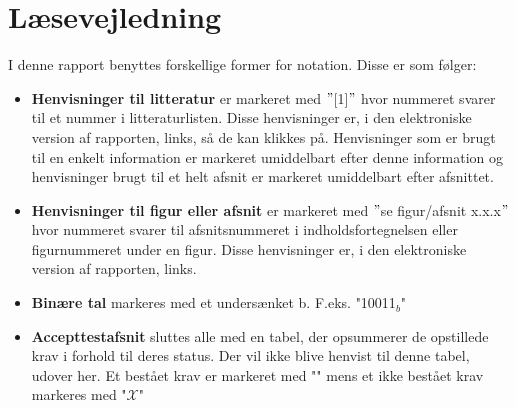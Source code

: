 \section*{Læsevejledning}
I denne rapport benyttes forskellige former for notation. Disse er som følger:

\begin{itemize}
\item \textbf{Henvisninger til litteratur} er markeret med $"$[1]$"$ hvor nummeret svarer til et nummer i litteraturlisten. Disse henvisninger er, i den elektroniske version af rapporten, links, så de kan klikkes på. Henvisninger som er brugt til en enkelt information er markeret umiddelbart efter denne information og henvisninger brugt til et helt afsnit er markeret umiddelbart efter afsnittet.

\item \textbf{Henvisninger til figur eller afsnit} er markeret med $"$se figur/afsnit x.x.x$"$ hvor nummeret svarer til afsnitsnummeret i indholdsfortegnelsen eller figurnummeret under en figur. Disse henvisninger er, i den elektroniske version af rapporten, links.

\item \textbf{Binære tal} markeres med et undersænket b. F.eks. "10011$_b$" 

\item \textbf{Accepttestafsnit} sluttes alle med en tabel, der opsummerer de opstillede krav i forhold til deres status. Der vil ikke blive henvist til denne tabel, udover her. Et bestået krav er markeret med "\checkmark" mens et ikke bestået krav markeres med "$\mathcal{X}$"
\end{itemize}
